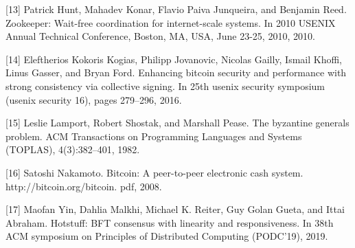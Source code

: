 [13]	Patrick Hunt, Mahadev Konar, Flavio Paiva Junqueira, and Benjamin Reed. Zookeeper: Wait-free coordination for internet-scale systems. In 2010 USENIX Annual Technical Conference, Boston, MA, USA, June 23-25, 2010, 2010.

[14]	Eleftherios Kokoris Kogias, Philipp Jovanovic, Nicolas Gailly, Ismail Khoffi, Linus Gasser, and Bryan Ford. Enhancing bitcoin security and performance with strong consistency via collective signing. In 25th {usenix} security symposium ({usenix} security 16), pages 279–296, 2016.

[15]	Leslie Lamport, Robert Shostak, and Marshall Pease. The byzantine generals problem. ACM Transactions on Programming Languages and Systems (TOPLAS), 4(3):382–401, 1982.

[16]	Satoshi Nakamoto. Bitcoin: A peer-to-peer electronic cash system. http://bitcoin.org/bitcoin. pdf, 2008.

[17]	Maofan Yin, Dahlia Malkhi, Michael K. Reiter, Guy Golan Gueta, and Ittai Abraham. Hotstuff: BFT consensus with linearity and responsiveness. In 38th ACM symposium on Principles of Distributed Computing (PODC’19), 2019.